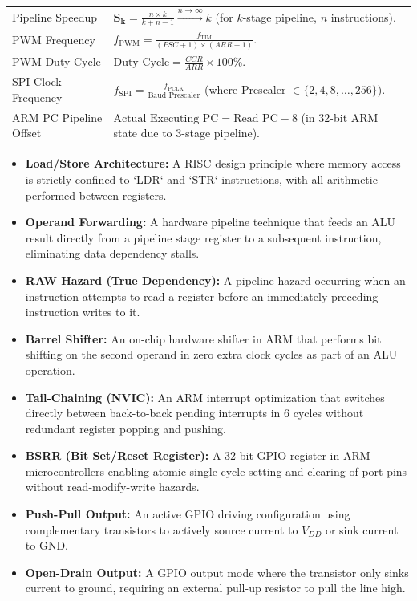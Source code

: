 \documentclass[12pt,a4paper]{article}
\renewcommand{\arraystretch}{1.45}
\begin{document}
\begin{tcolorbox}[formulabox, title={Key Formulas at a Glance}]
\renewcommand{\arraystretch}{1.3}
\noindent\begin{tabularx}{\linewidth}{B{4.5cm}Y}
Pipeline Speedup & $\mathbf{S_k} = \frac{n \times k}{k + n - 1} \xrightarrow{n \to \infty} k$ (for $k$-stage pipeline, $n$ instructions). \\
PWM Frequency & $f_{\mathrm{PWM}} = \frac{f_{\mathrm{TIM}}}{(PSC + 1) \times (ARR + 1)}$. \\
PWM Duty Cycle & $\text{Duty Cycle} = \frac{CCR}{ARR} \times 100\%$. \\
SPI Clock Frequency & $f_{\mathrm{SPI}} = \frac{f_{\mathrm{PCLK}}}{\text{Baud Prescaler}}$ (where Prescaler $\in \{2, 4, 8, \dots, 256\}$). \\
ARM PC Pipeline Offset & $\text{Actual Executing PC} = \text{Read PC} - 8$ (in 32-bit ARM state due to 3-stage pipeline). \\
\end{tabularx}\par
\end{tcolorbox}

\begin{tcolorbox}[defbox, title={One-Line Definitions}]
\begin{itemize}[leftmargin=*, itemsep=2.5pt]
  \item \textbf{Load/Store Architecture:} A RISC design principle where memory access is strictly confined to `LDR` and `STR` instructions, with all arithmetic performed between registers.
  \item \textbf{Operand Forwarding:} A hardware pipeline technique that feeds an ALU result directly from a pipeline stage register to a subsequent instruction, eliminating data dependency stalls.
  \item \textbf{RAW Hazard (True Dependency):} A pipeline hazard occurring when an instruction attempts to read a register before an immediately preceding instruction writes to it.
  \item \textbf{Barrel Shifter:} An on-chip hardware shifter in ARM that performs bit shifting on the second operand in zero extra clock cycles as part of an ALU operation.
  \item \textbf{Tail-Chaining (NVIC):} An ARM interrupt optimization that switches directly between back-to-back pending interrupts in 6 cycles without redundant register popping and pushing.
  \item \textbf{BSRR (Bit Set/Reset Register):} A 32-bit GPIO register in ARM microcontrollers enabling atomic single-cycle setting and clearing of port pins without read-modify-write hazards.
  \item \textbf{Push-Pull Output:} An active GPIO driving configuration using complementary transistors to actively source current to $V_{DD}$ or sink current to $\mathrm{GND}$.
  \item \textbf{Open-Drain Output:} A GPIO output mode where the transistor only sinks current to ground, requiring an external pull-up resistor to pull the line high.
\end{itemize}
\end{tcolorbox}
\end{document}
